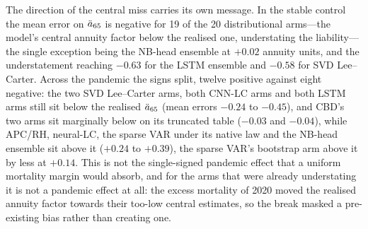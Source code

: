 The direction of the central miss carries its own message. In the stable
control the mean error on $\ddot{a}_{65}$ is negative for 19 of the 20
distributional arms---the model's central annuity factor below the realised
one, understating the liability---the single exception being the NB-head
ensemble at $+0.02$ annuity units, and the understatement reaching $-0.63$
for the LSTM ensemble and $-0.58$ for SVD Lee--Carter. Across the pandemic
the signs split, twelve positive against eight negative: the two SVD
Lee--Carter arms, both CNN-LC arms and both LSTM arms still sit below the
realised $\ddot{a}_{65}$ (mean errors $-0.24$ to $-0.45$), and CBD's two arms
sit marginally below on its truncated table ($-0.03$ and $-0.04$), while
APC/RH, neural-LC, the sparse VAR under its native law and the NB-head
ensemble sit above it ($+0.24$ to $+0.39$), the sparse VAR's bootstrap arm
above it by less at $+0.14$. This is not the single-signed pandemic effect
that a uniform mortality margin would absorb,
and for the arms that were already understating it is not a pandemic effect
at all: the excess mortality of 2020 moved the realised annuity factor
towards their too-low central estimates, so the break masked a pre-existing
bias rather than creating one.

